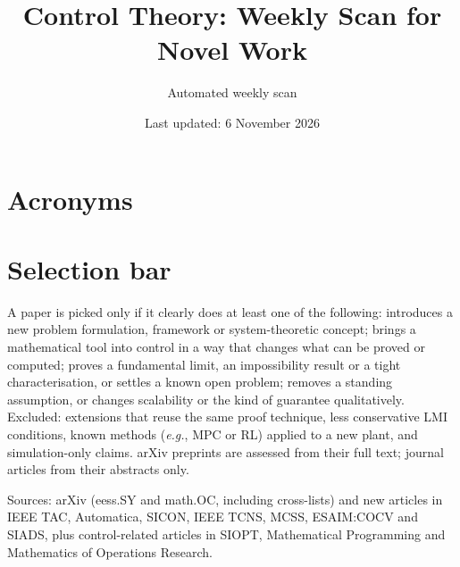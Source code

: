\documentclass[11pt,a4paper]{article}
\title{Control Theory: Weekly Scan for Novel Work}
\author{Automated weekly scan}
\date{Last updated: 6 November 2026} %
\newcommand{\eg}{\emph{e.g.}}
\begin{document}
\maketitle

\section*{Acronyms}
\begin{acronym}[MPC]
\end{acronym}

\section*{Selection bar}
A paper is picked only if it clearly does at least one of the following:
introduces a new problem formulation, framework or system-theoretic concept;
brings a mathematical tool into control in a way that changes what can be proved or computed;
proves a fundamental limit, an impossibility result or a tight characterisation, or settles a known open problem;
removes a standing assumption, or changes scalability or the kind of guarantee qualitatively.
Excluded: extensions that reuse the same proof technique, less conservative \ac{LMI} conditions,
known methods (\eg, \ac{MPC} or \ac{RL}) applied to a new plant, and simulation-only claims.
arXiv preprints are assessed from their full text; journal articles from their abstracts only.

Sources: arXiv (eess.SY and math.OC, including cross-lists) and new articles in IEEE TAC, Automatica, SICON,
IEEE TCNS, MCSS, ESAIM:COCV and SIADS, plus control-related articles in SIOPT, Mathematical Programming and
Mathematics of Operations Research.

\end{document}
